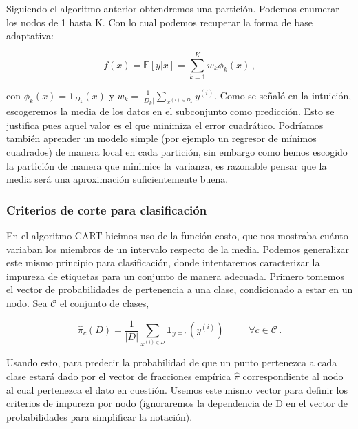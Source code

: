 Siguiendo el algoritmo anterior obtendremos una partición. Podemos enumerar los nodos de 1 hasta K. Con lo cual podemos recuperar la forma de base adaptativa:

\begin{equation}
    f(x) = \mathbb{E}[y | x] = \sum^K_{k=1} w_k \phi_k(x) \,,
\end{equation}

con $\phi_k(x) = \mathbf{1}_{D_k}(x)$ y $w_k = \frac{1}{|D_k|} \sum_{x^{(i) \in D_k}} y^{(i)}$. Como se señaló en la intuición, escogeremos la media de los datos en el subconjunto como predicción. Esto se justifica pues aquel valor es el que minimiza el error cuadrático. Podríamos también aprender un modelo simple (por ejemplo un regresor de mínimos cuadrados) de manera local en cada partición, sin embargo como hemos escogido la partición de manera que minimice la varianza, es razonable pensar que la media será una aproximación suficientemente buena.


\subsubsection{Criterios de corte para clasificación}

En el algoritmo CART hicimos uso de la función costo, que nos mostraba cuánto variaban los miembros de un intervalo respecto de la media. Podemos generalizar este mismo principio para clasificación, donde intentaremos caracterizar la impureza de etiquetas para un conjunto de manera adecuada. Primero tomemos el vector de probabilidades de pertenencia a una clase, condicionado a estar en un nodo. Sea $\mathcal{C}$ el conjunto de clases,

\begin{equation}
    \hat \pi_c (D) = \frac{1}{|D|} \sum_{x^{(i) \in D}} \mathbf{1}_{y=c}(y^{(i)}) \hspace{1cm} \, \forall c \in \mathcal{C} \,.
\end{equation}

Usando esto, para predecir la probabilidad de que un punto pertenezca a cada clase estará dado por el vector de fracciones empírica $\hat \pi$ correspondiente al nodo al cual pertenezca el dato en cuestión. Usemos este mismo vector para definir los criterios de impureza por nodo (ignoraremos la dependencia de D en el vector de probabilidades para simplificar la notación).

